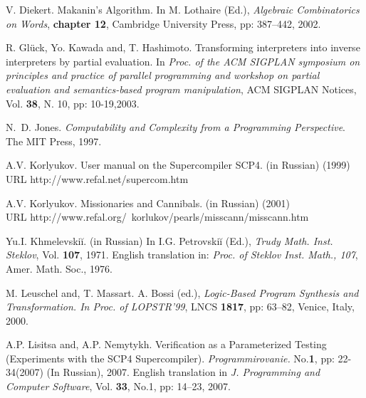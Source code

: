 \documentclass[preprint]{sigplanconf}
\newcommand{\url}{}
\begin{document}
\begin{thebibliography}{}
\softraggedright

V. Diekert. \newblock Makanin's Algorithm. \newblock In M. Lothaire (Ed.), \emph{Algebraic Combinatorics on Words},  {\bfseries chapter 12}, Cambridge University Press, pp: 387--442, 2002.

R. Gl\"{u}ck, Yo. Kawada and, T. Hashimoto. 
     \newblock Transforming interpreters into inverse interpreters by partial evaluation. 
     \newblock In 
      \emph{Proc. of the ACM SIGPLAN symposium on principles and practice of parallel programming  and workshop on partial evaluation and semantics-based program manipulation},
 ACM SIGPLAN Notices, Vol. {\bfseries 38},  N. 10, pp: 10-19,2003.

N.~D. Jones.
      \newblock \emph{Computability and Complexity from a Programming Perspective}.
      {The MIT Press},
      1997.

A.V. Korlyukov.
       \newblock User manual on the Supercompiler SCP4. (in Russian)
       (1999)
       \newblock URL \url{http://www.refal.net/supercom.htm}
       
A.V. Korlyukov.
       \newblock Missionaries and Cannibals. (in Russian)
       (2001)\\
       \newblock URL \url{http://www.refal.org/~korlukov/pearls/misscann/misscann.htm}
       
Yu.I. Khmelevski\u{i}.
        (in Russian) 
       \newblock In I.G. Petrovski\u{i} (Ed.), 
       \emph{Trudy Math. Inst. Steklov}, Vol. {\bfseries 107}, 1971. 
       \newblock English translation in: 
       \emph{Proc. of Steklov Inst. Math., 107}, Amer. Math. Soc., 1976.

M. Leuschel and, T.  Massart.
          \newblock  A. Bossi (ed.), \emph{Logic-Based Program Synthesis and Transformation. 
               In Proc. of LOPSTR'99}, 
                LNCS {\bf 1817}, pp: 63--82,
               Venice, Italy, 2000.

A.P. Lisitsa and, A.P. Nemytykh.
        \newblock Verification as a Parameterized Testing (Experiments with the SCP4
        Supercompiler). 
        \newblock \emph{Programmirovanie.} No.{\bfseries 1}, pp: 22-34(2007) 
        (In Russian), 2007.
        \newblock English translation in \emph{J. Programming and Computer Software}, 
        Vol. {\bfseries 33}, No.1, pp: 14--23, 2007.



\end{thebibliography}
\end{document}
